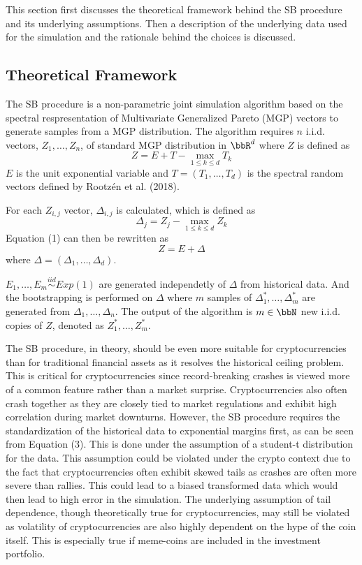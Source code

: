 \documentclass[a4paper,11pt]{article}
\begin{document}
This section first discusses the theoretical framework behind the SB procedure and its underlying assumptions.
Then a description of the underlying data used for the simulation and the rationale behind the choices is discussed.

\subsection{Theoretical Framework}

The SB procedure is a non-parametric joint simulation algorithm based on the spectral respresentation of Multivariate Generalized Pareto (MGP) vectors to generate samples from a MGP distribution.
The algorithm requires $n$ i.i.d. vectors, $Z_1, \ldots, Z_n$, of standard MGP distribution in $\bbR^d$ where $Z$ is defined as 
\begin{equation}
    Z = E + T - \underset{1\leq k\leq d}{\max} T_k
\end{equation}
$E$ is the unit exponential variable and $T = (T_1,\ldots,T_d)$ is the spectral random vectors defined by Rootzén et al. (2018).

For each $Z_{i,j}$ vector, $\Delta_{i,j}$ is calculated, which is defined as 
\begin{equation}
    \Delta_j = Z_j - \underset{1\leq k\leq d}{\max} Z_k
\end{equation}
Equation (1) can then be rewritten as 
\begin{equation}
    Z = E + \Delta
\end{equation}
where $\Delta = (\Delta_1,\ldots,\Delta_d)$.

$E_1,\ldots,E_m\overset{iid}{\sim} Exp(1)$ are generated independetly of $\Delta$ from historical data.
And the bootstrapping is performed on $\Delta$ where $m$ samples of $\Delta^*_1,\ldots,\Delta^*_m$ are generated from $\Delta_1,\ldots,\Delta_n$.
The output of the algorithm is $m\in\bbN$ new i.i.d. copies of $Z$, denoted as $Z^*_1,\ldots, Z^*_m$.

The SB procedure, in theory, should be even more suitable for cryptocurrencies than for traditional financial assets as it resolves the historical ceiling problem.
This is critical for cryptocurrencies since record-breaking crashes is viewed more of a common feature rather than a market surprise.
Cryptocurrencies also often crash together as they are closely tied to market regulations and exhibit high correlation during market downturns.
However, the SB procedure requires the standardization of the historical data to exponential margins first, as can be seen from Equation (3).
This is done under the assumption of a student-t distribution for the data.
This assumption could be violated under the crypto context due to the fact that cryptocurrencies often exhibit skewed tails as crashes are often more severe than rallies.
This could lead to a biased transformed data which would then lead to high error in the simulation.
The underlying assumption of tail dependence, though theoretically true for cryptocurrencies, may still be violated as volatility of cryptocurrencies are also highly dependent on the hype of the coin itself.
This is especially true if meme-coins are included in the investment portfolio.
\end{document}
